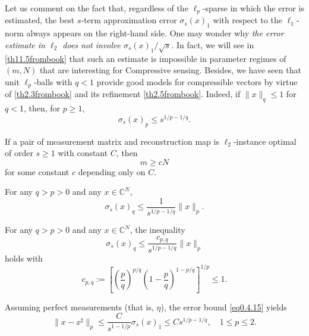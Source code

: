 \begin{remark}
    \label{rmk0.4.23}
    Let us comment on the fact that, regardless of the $\ell_p$-sparse in which the error is estimated, the best $s$-term approximation error $\sigma_s(x)_1$ with respect to the $\ell_1$-norm always appears on the right-hand side. One may wonder why \emph{\textcolor[rgb]{1,0,0}{the error estimate in $\ell_2$ does not involve $\sigma_s(x)_1/\sqrt{s}$.}} In fact, we will see in \cref{th11.5frombook} that such an estimate is impossible in parameter regimes of $(m, N)$ that are interesting for Compressive sensing. Besides, we have seen that unit $\ell_p$-balls with $q<1$ provide good models for compressible vectors by virtue of \cref{th2.3frombook} and its refinement \cref{th2.5frombook}. Indeed, if $\|x\|_q \leq 1$ for $q<1$, then, for $p \geq 1$,
    \[
        \sigma_s(x)_p \leq s^{1/p-1/q}.
    \]
\end{remark}
\begin{mdframed}
    \begin{theorem}
        \label{th11.5frombook}
        If a pair of measurement matrix and reconstruction map is $\ell_2$-instance optimal of order $s \geq 1$ with constant $C$, then
        \begin{equation}
            m \geq cN
            \label{eq11.3frombook}
        \end{equation}
        for some constant $c$ depending only on $C$.
    \end{theorem}
    \begin{theorem}
        \label{th2.3frombook}
        For any $q>p>0$ and any $x \in \mathbb{C}^N$,
        \[
            \sigma_s(x)_q \leq \frac{1}{s^{1/p-1/q}} \|x\|_p.
        \]
    \end{theorem}
    \begin{theorem}
        \label{th2.5frombook}
        For any $q>p>0$ and any $x \in \mathbb{C}^N$, the inequality 
        \[
            \sigma_s(x)_q \leq \frac{c_{p,q}}{s^{1/p-1/q}} \|x\|_p
        \]
        holds with
        \[
            c_{p,q} := \left[ \left( \dfrac{p}{q} \right)^{p/q} \left( 1- \dfrac{p}{q}  \right)^{1-p/q} \right]^{1/p} \leq 1.
        \]
    \end{theorem}
\end{mdframed}

Assuming perfect measurements (that is, $\eta$), the error bound \cref{eq0.4.15} yields
\[
    \|x-x^{\sharp}\|_p \leq \frac{C}{s^{1-1/p}} \sigma_s(x)_1 \leq Cs^{1/p-1/q}, \quad 1 \leq p \leq 2.
\]

